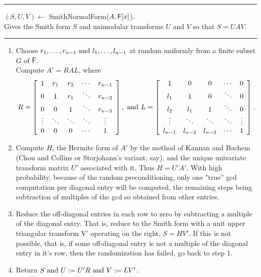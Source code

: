 \documentclass[10pt]{article}
\newcommand{\Line} {\vspace{1ex} \hrule \vspace{1ex}}
\begin{document}
\Line
\begin{center}
$(S, U, V) \leftarrow $ SmithNormalForm($A, {\mathsf F}[x]$).\\
\bc Gives the Smith form $S$ and unimodular transforms $U$ and $V$ so that $S = UAV$. \ec
\end{center}
\Line
\begin{enumerate}
\item
Choose $r_1, \ldots, r_{n-1} ~\mbox{and}~ l_1, \ldots, l_{n-1}$ at random uniformly
from a finite subset $G$ of ${\mathsf F}$.\\
Compute  $ A' = RAL$, where
\[ R = 
\left[ \begin{array}{ccccc}
1      & r_1    & r_2    & \cdots & r_{n-1}\\
0      & 1      & r_1    & \ddots & r_{n-2}\\
0      & 0      & 1      & \ddots & r_{n-3}\\
\vdots & \ddots & \ddots & \ddots & \vdots \\
0      & 0      & 0      & \cdots & 1      \\
\end{array}\right],
~\mbox{and}~
L = 
\left[ \begin{array}{ccccc}
1       & 0       & 0       & \cdots & 0      \\
l_1     & 1       & 0       & \ddots & 0      \\
l_2     & l_1     & 1       & \ddots & 0      \\
\vdots  & \ddots  & \ddots  & \ddots & \vdots \\
l_{n-1} & l_{n-2} & l_{n-3} & \cdots & 1      \\
\end{array}\right]. \]
\item
Compute $H$, the Hermite form of $A'$ by the method of Kannan and Bachem 
(Chou and Collins or Storjohann's variant, say).
and the unique univariate transform matrix $U'$ associated with it.  Thus $H = U'A'$. 
With high probability, because of the random preconditioning, only one "true'' gcd computation
per diagonal entry will be computed, the remaining steps being subtraction of multiples of the 
gcd so obtained from other entries.
\item
Reduce the off-diagonal entries in each row to zero by subtracting a multiple of the diagonal
entry.  That is, reduce to the Smith form with a unit upper triangular transform V' 
operating on the right, $S = HV'$.  If this is not possible, that is, if some 
off-diagonal entry is not a multiple of the
diagonal entry in it's row, then the randomization has failed, go back to step 1.
\item
Return $S ~\mbox{and}~ U := U'R ~\mbox{and}~ V := LV'$.
\end{enumerate}
\end{document}
